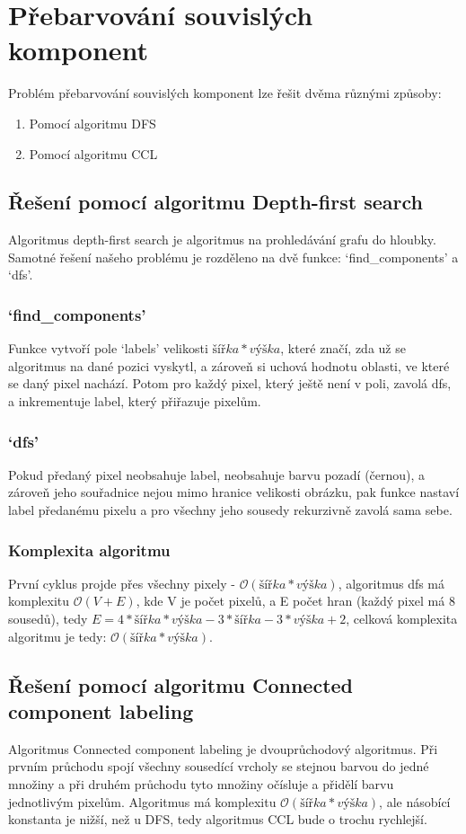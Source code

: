 \section{Přebarvování souvislých komponent}
Problém přebarvování souvislých komponent lze řešit dvěma různými způsoby:
\begin{enumerate}
	\item Pomocí algoritmu DFS
	\item Pomocí algoritmu CCL
\end{enumerate}

\subsection{Řešení pomocí algoritmu Depth-first search}
Algoritmus depth-first search je algoritmus na prohledávání grafu do hloubky.
Samotné řešení našeho problému je rozděleno na dvě funkce: `find\_components' a
`dfs'.

\subsubsection{`find\_components'}
Funkce vytvoří pole `labels' velikosti $šířka * výška$, které značí, zda už se
algoritmus na dané pozici vyskytl, a zároveň si uchová hodnotu oblasti, ve
které se daný pixel nachází.
Potom pro každý pixel, který ještě není v poli, zavolá dfs, a inkrementuje
label, který přiřazuje pixelům.

\subsubsection{`dfs'}
Pokud předaný pixel neobsahuje label, neobsahuje barvu pozadí (černou), a
zároveň jeho souřadnice nejou mimo
hranice velikosti obrázku, pak
funkce nastaví label předanému pixelu a pro všechny jeho sousedy rekurzivně
zavolá sama sebe.

\subsubsection{Komplexita algoritmu}
První cyklus projde přes všechny pixely - $\mathcal{O}(šířka * výška)$,
algoritmus dfs má
komplexitu $\mathcal{O}(V+E)$, kde V je počet pixelů, a E počet hran (každý
pixel má
8 sousedů), tedy $E = 4*šířka*výška-3*šířka-3*výška + 2$, celková komplexita
algoritmu je tedy:
$\mathcal{O}(šířka * výška)$.

\subsection{Řešení pomocí algoritmu Connected component labeling}
Algoritmus Connected component labeling je dvouprůchodový algoritmus. Při
prvním průchodu spojí všechny sousedící vrcholy se stejnou barvou do jedné
množiny a při druhém průchodu tyto množiny očísluje a přidělí barvu jednotlivým
pixelům. Algoritmus má komplexitu
$\mathcal{O}(šířka * výška)$, ale násobící konstanta je nižší, než u
DFS, tedy algoritmus CCL bude o trochu rychlejší.

